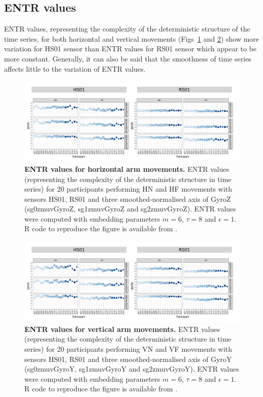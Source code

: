 \subsection{ENTR values}
ENTR values, representing the complexity of the deterministic structure 
of the time series, for both horizontal and vertical movements 
(Figs~\ref{fig:entr_aH} and \ref{fig:entr_aV}) show more variation 
for HS01 sensor than ENTR values for RS01 sensor which appear 
to be more constant. 
Generally, it can also be said that the smoothness of time series affects 
little to the variation of ENTR values.
\begin{figure}[!h]
\centering
\includegraphics[width=1.0\textwidth]{entr_aH}
    \caption{
	{\bf ENTR values for horizontal arm movements.}
    	ENTR values (representing the complexity of the deterministic structure in time series) for 
	20 participants performing HN and HF movements
	with sensors HS01, RS01 and three smoothed-normalised axis 
	of GyroZ (sg0zmuvGyroZ, sg1zmuvGyroZ and sg2zmuvGyroZ).
	ENTR values were computed with 
	embedding parameters $m=6$, $\tau=8$ and $\epsilon=1$.
	R code to reproduce the figure is available from \cite{hwum2018}.
        }
    \label{fig:entr_aH}
\end{figure}
\begin{figure}[!h]
\centering
\includegraphics[width=1.0\textwidth]{entr_aV}
    \caption{
	{\bf ENTR values for vertical arm movements.}
    	ENTR values (representing the complexity of the deterministic structure in time series) for 
	20 participants performing VN and VF movements
	with sensors HS01, RS01 and three smoothed-normalised axis 
	of GyroY (sg0zmuvGyroY, sg1zmuvGyroY and sg2zmuvGyroY).
	ENTR values were computed with 
	embedding parameters $m=6$, $\tau=8$ and $\epsilon=1$.
	R code to reproduce the figure is available from \cite{hwum2018}.
        }
    \label{fig:entr_aV}
\end{figure}




